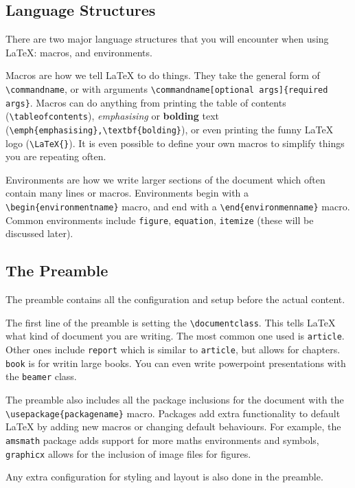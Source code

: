 \documentclass{article}
\begin{document}
\subsection{Language Structures}
There are two major language structures that you will encounter when using \LaTeX{}: macros, and environments.

Macros are how we tell \LaTeX{} to do things. They take the general form of \lstinline{\commandname}, or with arguments \lstinline|\commandname[optional args]{required args}|. Macros can do anything from printing the table of contents (\lstinline{\tableofcontents}), \emph{emphasising} or \textbf{bolding} text (\lstinline|\emph{emphasising},\textbf{bolding}|), or even printing the funny \LaTeX{} logo (\lstinline|\LaTeX{}|). It is even possible to define your own macros to simplify things you are repeating often.

Environments are how we write larger sections of the document which often contain many lines or macros. Environments begin with a \lstinline|\begin{environmentname}| macro, and end with a \lstinline|\end{environmenname}| macro. Common environments include \lstinline{figure}, \lstinline{equation}, \lstinline{itemize} (these will be discussed later).

\subsection{The Preamble}
The preamble contains all the configuration and setup before the actual content.

The first line of the preamble is setting the \lstinline{\documentclass}. This tells \LaTeX{} what kind of document you are writing. The most common one used is \lstinline{article}. Other ones include \lstinline{report} which is similar to \lstinline{article}, but allows for chapters. \lstinline{book} is for writin large books. You can even write powerpoint presentations with the \lstinline{beamer} class.

The preamble also includes all the package inclusions for the document with the \lstinline|\usepackage{packagename}| macro. Packages add extra functionality to default \LaTeX{} by adding new macros or changing default behaviours. For example, the \lstinline{amsmath} package adds support for more maths environments and symbols, \lstinline{graphicx} allows for the inclusion of image files for figures.

Any extra configuration for styling and layout is also done in the preamble.
\end{document}
